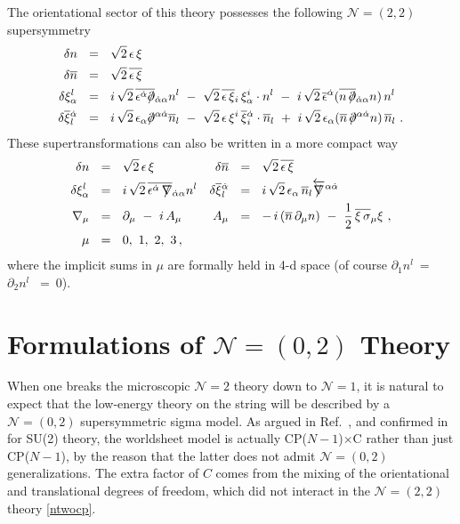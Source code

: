 \documentclass[12pt]{article}
\newcommand{\ntwo}{${\mathcal N}=2$ }
\newcommand{\ntwot}{${\mathcal N}= \left(2,2\right) $ }
\newcommand{\ntwoo}{${\mathcal N}= \left(0,2\right) $ }
\newcommand{\nonen}{${\mathcal N}=1$}
\newcommand{\p}{\partial}
\newcommand{\ov}{\overline}
\def\slashed#1{\setbox0=\hbox{$#1$}             %
   \dimen0=\wd0                                 %
   \setbox1=\hbox{/} \dimen1=\wd1               %
   \ifdim\dimen0>\dimen1                        %
      \rlap{\hbox to \dimen0{\hfil/\hfil}}      %
      #1                                        %
   \else                                        %
      \rlap{\hbox to \dimen1{\hfil$#1$\hfil}}   %
      /                                         %
   \fi}                                        %
\newcommand{\nbar}{\ov{n}}
\newcommand{\CPC}{CP($N-1$)$\times$C }
\begin{document}
	The orientational sector of this theory possesses the following \ntwot supersymmetry
\begin{align}
%
\notag
	\delta n     & ~~=~~ \sqrt{2}\, \epsilon\, \xi  \\
%
\notag
	\delta \nbar & ~~=~~ \sqrt{2}\, \ov{\epsilon\, \xi} \\
%
\label{susy_ntwot}
	\delta \xi_\alpha^l & ~~=~~
			i\,\sqrt{2}\, \ov{\epsilon^{\dot{\alpha}}\slashed{\p}}{}_{\dot{\alpha}\alpha} n^l 
		~-~	\sqrt{2}\, \ov{\epsilon\,\xi}{}_i\,\xi_\alpha^i \cdot n^l
		~-~     i\,\sqrt{2}\, \ov{\epsilon}{}^{\dot{\alpha}} 
			( \ov{n\, \slashed{\p}}{}_{\dot{\alpha}\alpha}n )\, n^l
	\\
%
\notag
	\delta \ov{\xi}{}^{\dot{\alpha}}_l & ~~=~~
			i\,\sqrt{2}\, \epsilon_\alpha \slashed{\p}{}^{\alpha\dot{\alpha}} \nbar{}_l
		~-~     \sqrt{2}\, \epsilon\, \xi^i\, \ov{\xi}{}_i^{\dot{\alpha}} \cdot \nbar{}_l 
		~+~     i\,\sqrt{2}\, \epsilon_\alpha (\ov{n}\, \slashed{\p}{}^{\alpha\dot{\alpha}} n)\, \nbar{}_l~.
%
\end{align}
	These supertransformations can also be written in a more compact way 
\begin{align*}
%
	\delta n     & ~~=~~ \sqrt{2}\, \epsilon\, \xi  
	& 
	\delta \nbar & ~~=~~ \sqrt{2}\, \ov{\epsilon\, \xi} \\
%
	\delta \xi_\alpha^l & ~~=~~ i\,\sqrt{2}\, \ov{\epsilon^{\dot{\alpha}}\, \slashed{\nabla}}{}_{\dot{\alpha}\alpha} n^l 
	&
	\delta \ov{\xi}{}^{\dot{\alpha}}_l & ~~=~~
			i\,\sqrt{2}\,\epsilon_\alpha\, \nbar{}_l \overleftarrow{\slashed{\nabla}}{}^{\alpha\dot{\alpha}} \\
%
	\nabla_\mu  & ~~=~~ \p_\mu ~-~ i\, A_\mu 
	&
	A_\mu       & ~~=~~ -\,i\, (\nbar\,\p_\mu n)  ~-~ \frac{1}{2}\, \ov{\xi\,\sigma}{}_\mu \xi~,
	\\
 	\mu & ~~=~~ 0,~1,~2,~3\,,
\end{align*}
	where the implicit sums in $ \mu $ are formally held in 4-d space (of course $ \p_1 n^l ~=~ $ $ \p_2 n^l $ $ ~=~ 0 $).


%
%
\section{Formulations of \boldmath\ntwoo Theory}
\setcounter{equation}{0}

	When one breaks the microscopic \ntwo theory down to \nonen, it is natural to expect
that the low-energy theory on the string will be described by a \ntwoo supersymmetric sigma model.
As argued in Ref.~\cite{Edalati}, and confirmed in \cite{SYhet} for SU(2) theory,
the worldsheet model is actually \CPC rather than just CP($N-1$), by the reason
that the latter does not admit \ntwoo generalizations. 
The extra factor of $C$ comes from the mixing of the orientational and translational degrees of
freedom, which did not interact in the \ntwot theory \eqref{ntwocp}.
\end{document}
